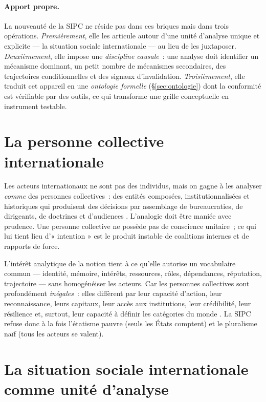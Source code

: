 \documentclass[11pt,a4paper]{article}
\begin{document}
\paragraph{Apport propre.} La nouveauté de la SIPC ne réside pas dans ces briques mais dans
trois opérations. \emph{Premièrement}, elle les articule autour d'une unité d'analyse unique et
explicite --- la situation sociale internationale --- au lieu de les juxtaposer.
\emph{Deuxièmement}, elle impose une \emph{discipline causale}~: une analyse doit identifier un
mécanisme dominant, un petit nombre de mécanismes secondaires, des trajectoires conditionnelles
et des signaux d'invalidation. \emph{Troisièmement}, elle traduit cet appareil en une
\emph{ontologie formelle} (\S\ref{sec:ontologie}) dont la conformité est vérifiable par des
outils, ce qui transforme une grille conceptuelle en instrument testable.

\section{La personne collective internationale}

Les acteurs internationaux ne sont pas des individus, mais on gagne à les analyser \emph{comme}
des personnes collectives~: des entités composées, institutionnalisées et historiques qui
produisent des décisions par assemblage de bureaucraties, de dirigeants, de doctrines et
d'audiences \autocite{weber1978}. L'analogie doit être maniée avec prudence. Une personne
collective ne possède pas de conscience unitaire~; ce qui lui tient lieu d'« intention » est le
produit instable de coalitions internes et de rapports de force.

L'intérêt analytique de la notion tient à ce qu'elle autorise un vocabulaire commun ---
identité, mémoire, intérêts, ressources, rôles, dépendances, réputation, trajectoire --- sans
homogénéiser les acteurs. Car les personnes collectives sont profondément \emph{inégales}~:
elles diffèrent par leur capacité d'action, leur reconnaissance, leurs capitaux, leur accès aux
institutions, leur crédibilité, leur résilience et, surtout, leur capacité à définir les
catégories du monde \autocite{foucault1977}. La SIPC refuse donc à la fois l'étatisme pauvre
(seuls les États comptent) et le pluralisme naïf (tous les acteurs se valent).

\section{La situation sociale internationale comme unité d'analyse}
\end{document}
